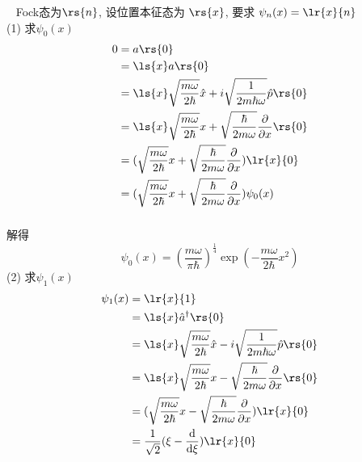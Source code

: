 \begin{frame}
    \frametitle{}
    \例 [12. 求Fock态在位置表象中的波函数]{}
    \解~ Fock态为$\rs{n}$, 设位置本征态为 $\rs{x}$, 要求 $\psi_n (x)=\lr{x}{n} $  \\
    (1) 求$\psi_0 (x)$
    \[ 
  \begin{aligned}
    0 &= a \rs{0}  \\ 
    &= \ls{x} a \rs{0}  \\ 
    &= \ls{x} \sqrt{\frac{m\omega}{2\hbar}}\hat{x} + i \sqrt{\frac{1}{2 m \hbar \omega}} \hat{p} \rs{0}  \\ 
    &= \ls{x} \sqrt{\frac{m\omega}{2\hbar}} x + \sqrt{\frac{\hbar}{2 m \omega}} \frac{\partial }{\partial x } \rs{0}  \\ 
    &= (\sqrt{\frac{m\omega}{2\hbar}} x + \sqrt{\frac{\hbar}{2 m \omega}} \frac{\partial }{\partial x } )\lr{x}{0}  \\ 
    &= (\sqrt{\frac{m\omega}{2\hbar}} x + \sqrt{\frac{\hbar}{2 m \omega}} \frac{\partial }{\partial x } ) \psi_0 (x) \\ 
  \end{aligned} \] 
  
\end{frame}

\begin{frame}
    \frametitle{}
    解得 \[ 
      \psi_0 (x)=  (\frac{m \omega }{\pi  \hbar})^{\frac{1}{4}}  \exp(- \frac{m \omega }{2 \hbar} x^2) \]
    (2) 求$\psi_1 (x)$
    \[ 
      \begin{aligned}
        \psi_1 (x) &= \lr{x}{1}  \\ 
        &=  \ls{x} \hat{a}^\dagger \rs{0}   \\ 
        &= \ls{x} \sqrt{\frac{m\omega}{2\hbar}}\hat{x} - i \sqrt{\frac{1}{2 m \hbar \omega}} \hat{p} \rs{0}  \\ 
        &= \ls{x} \sqrt{\frac{m\omega}{2\hbar}} x - \sqrt{\frac{\hbar}{2 m \omega}} \frac{\partial }{\partial x } \rs{0}  \\ 
        &= (\sqrt{\frac{m\omega}{2\hbar}} x - \sqrt{\frac{\hbar}{2 m \omega}} \frac{\partial }{\partial x } )\lr{x}{0}  \\ 
        &= \frac{1}{\sqrt{2}} (\xi - \frac{\mathrm{d}}{\mathrm{d}\xi}) \lr{x}{0} 
      \end{aligned} \] 
\end{frame}

